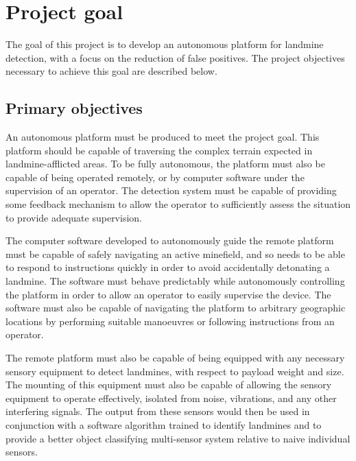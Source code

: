 \documentclass[main.tex]{subfiles}
\begin{document}
% 
% 
%

\section{Project goal}

The goal of this project is to develop an autonomous platform for landmine detection, with a focus on the reduction of false positives. The project objectives necessary to achieve this goal are described below.
 
\subsection{Primary objectives}
An autonomous platform must be produced to meet the project goal. This platform should be capable of traversing the complex terrain expected in landmine-afflicted areas. To be fully autonomous, the platform must also be capable of being operated remotely, or by computer software under the supervision of an operator. The detection system must be capable of providing some feedback mechanism to allow the operator to sufficiently assess the situation to provide adequate supervision.

The computer software developed to autonomously guide the remote platform must be capable of safely navigating an active minefield, and so needs to be able to respond to instructions quickly in order to avoid accidentally detonating a landmine. The software must behave predictably while autonomously controlling the platform in order to allow an operator to easily supervise the device. The software must also be capable of navigating the platform to arbitrary geographic locations by performing suitable manoeuvres or following instructions from an operator.

The remote platform must also be capable of being equipped with any necessary sensory equipment to detect landmines, with respect to payload weight and size. 
The mounting of this equipment must also be capable of allowing the sensory equipment to operate effectively, isolated from noise, vibrations, and any other interfering signals. 
The output from these sensors would then be used in conjunction with a software algorithm trained to identify landmines and to provide a better object classifying multi-sensor system relative to naive individual sensors.
\end{document}
